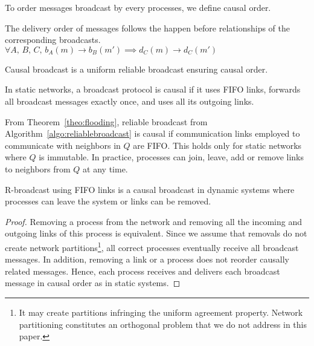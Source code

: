To order messages broadcast by every processes, we define causal order.

\begin{definition}
  The delivery order of messages follows the happen before relationships of the
  corresponding broadcasts. $\forall A,\,B,\,C,\,
  b_A(m) \rightarrow b_B(m') \implies d_C(m) \rightarrow d_C(m')$
\end{definition}

\begin{definition}
  Causal broadcast is a uniform reliable broadcast ensuring causal order.
\end{definition}

\begin{theorem}
  In static networks, a broadcast protocol is causal if it uses FIFO links,
  forwards all broadcast messages exactly once, and uses all its outgoing links.
\end{theorem}

From Theorem~\ref{theo:flooding}, reliable broadcast from
Algorithm~\ref{algo:reliablebroadcast} is causal if communication links employed
to communicate with neighbors in $Q$ are FIFO. This holds only for static
networks where $Q$ is immutable. In practice, processes can join, leave, add or
remove links to neighbors from $Q$ at any time.

\begin{lemma}
  R-broadcast using FIFO links is a causal broadcast in dynamic systems where
  processes can leave the system or links can be removed.
\end{lemma}

\begin{proof}
  Removing a process from the network and removing all the incoming and outgoing
  links of this process is equivalent. Since we assume that removals do not
  create network partitions\footnote{It may create partitions infringing the
    uniform agreement property. Network partitioning constitutes an orthogonal
    problem that we do not address in this paper.}, all correct processes
  eventually receive all broadcast messages. In addition, removing a link or a
  process does not reorder causally related messages. Hence, each process
  receives and delivers each broadcast message in causal order as in static
  systems.
\end{proof}

